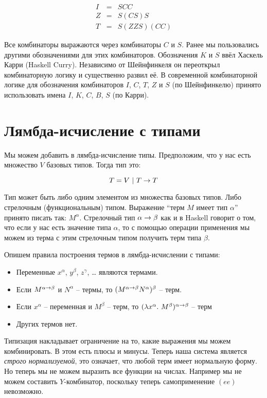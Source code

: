 \begin{eqnarray*}
I &=& SCC \\
Z &=& S(CS)S \\
T &=& S(ZZS)(CC)
\end{eqnarray*}

Все комбинаторы выражаются через комбинаторы $C$ и $S$. Ранее мы
пользовались другими обозначениями для этих комбинаторов. Обозначения
$K$ и $S$ ввёл Хаскель Карри (Haskell Curry). Независимо от Шейнфинкеля
он переоткрыл комбинаторную логику и существенно развил её. В
современной комбинаторной логике для обозначения комбинаторов $I$, $C$,
$T$, $Z$ и $S$ (по Шейнфинкелю) принято использовать имена $I$, $K$,
$C$, $B$, $S$ (по Карри).

\section{Лямбда-исчисление с типами}

Мы можем добавить в лямбда-исчисление типы. Предположим, что у нас есть
множество $V$ базовых типов. Тогда тип это:

\[T = V \ |\  T \rightarrow T\]

Тип может быть либо одним элементом из множества базовых типов. Либо
стрелочным (функциональным) типом. Выражение ``терм $M$ имеет тип
$\alpha$'' принято писать так: $M^{\alpha}$. Стрелочный тип
$\alpha \rightarrow \beta$ как и в Haskell говорит о том, что если у нас есть
значение типа $\alpha$, то с помощью операции применения мы можем из
терма с этим стрелочным типом получить терм типа $\beta$.

Опишем правила построения термов в лямбда-исчислении с типами:

\begin{itemize}
\item
  Переменные $x^\alpha$, $y^\beta$, $z^\gamma$, \ldots{} являются
  термами.
\item
  Если $M^{\alpha \rightarrow \beta}$ и $N^\alpha$ -- термы, то
  $(M^{\alpha \rightarrow \beta}N^\alpha)^\beta$ -- терм.
\item
  Если $x^\alpha$ -- переменная и $M^\beta$ -- терм, то
  $(\lambda x^\alpha .\  M^\beta)^{\alpha \rightarrow \beta}$ -- терм
\item
  Других термов нет.
\end{itemize}

Типизация накладывает ограничение на то, какие выражения мы можем
комбинировать. В этом есть плюсы и минусы. Теперь наша система является
\emph{строго нормализуемой}, это означает, что любой терм имеет
нормальную форму. Но теперь мы не можем выразить все функции на числах.
Например мы не можем составить $Y$-комбинатор, поскольку теперь
самоприменение $(e e)$ невозможно.

